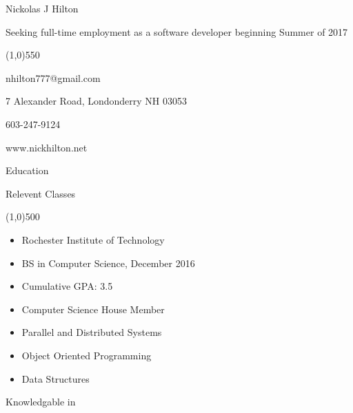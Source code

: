\documentclass{article}
\begin{document}
\begin{minipage}[t]{0.4\textwidth}
  {\Huge Nickolas J Hilton }
\end{minipage}
\begin{minipage}[b]{0.6\textwidth}
  \begin{flushright}
  Seeking full-time employment as a software developer beginning Summer of 2017 
  \end{flushright}
\end{minipage}
\begin{center}
  \line(1,0){550}
\end{center}
\begin{center}
  nhilton777@gmail.com 
  \begin{inparaitem}
    \item 7 Alexander Road, Londonderry NH 03053 
    \item 603-247-9124 
    \item www.nickhilton.net 
  \end{inparaitem}
\end{center}
\begin{minipage}[t]{0.5\textwidth}
  {\Large Education } 
\end{minipage}
\begin{minipage}[t]{0.5\textwidth}
  {\Large Relevent Classes } 
\end{minipage}
\begin{center}
  \line(1,0){500}
\end{center}
\begin{minipage}[t]{0.5\textwidth}
  \begin{itemize}
    \item Rochester Institute of Technology 
    \item BS in Computer Science, December 2016 
    \item Cumulative GPA: 3.5 
    \item Computer Science House Member 
  \end{itemize}
\end{minipage}
\begin{minipage}[t]{0.5\textwidth}
  \begin{itemize}
    \item Parallel and Distributed Systems 
    \item Object Oriented Programming 
    \item Data Structures 
  \end{itemize}
\end{minipage}
{\Large Knowledgable in }\\ 
\end{document}
